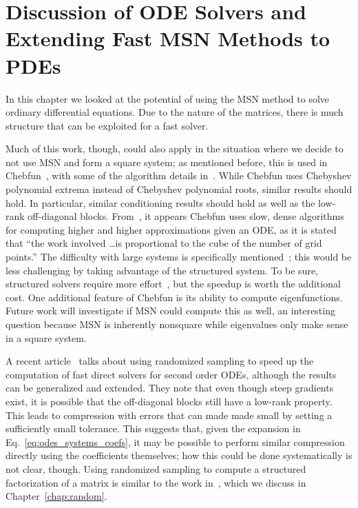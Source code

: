 \section{Discussion of ODE Solvers and Extending Fast MSN Methods to PDEs}
\label{sec:odes_discussion}

In this chapter we looked at the potential of using the MSN
method to solve ordinary differential equations.
Due to the nature of the \CV{} matrices, there is much structure
that can be exploited for a fast solver.

Much of this work, though, could also apply in the situation where
we decide to not use MSN and form a square system; as mentioned before,
this is used in Chebfun~\cite{driscoll2014chebfun}, with some
of the algorithm details
in~\cite{driscoll2015rectangular,aurentz2017block,xu2015explicit}.
While Chebfun uses Chebyshev polynomial extrema instead of Chebyshev
polynomial roots, similar results should hold.
In particular, similar conditioning results should hold
as well as the low-rank off-diagonal blocks.
From~\cite[Appendix A]{ExpODEs}, it appears Chebfun uses slow, dense
algorithms for computing higher and higher approximations given
an ODE, as it is stated that ``the work involved \dots is proportional to
the cube of the number of grid points.''
The difficulty with large systems is specifically
mentioned~\cite[Pages 306--307]{ExpODEs}; this would be less challenging
by taking advantage of the structured system.
To be sure, structured solvers require more effort~\cite{randomHSSLBL},
but the speedup is worth the additional cost.
One additional feature of Chebfun is its ability to compute eigenfunctions.
Future work will investigate if MSN could compute this as well,
an interesting question because MSN is inherently nonsquare while
eigenvalues only make sense in a square system.

A recent article~\cite{shen2016fast} talks about using
randomized sampling to speed up the computation of fast direct
solvers for second order ODEs, although the results can be generalized
and extended.
They note that even though steep gradients exist, it is possible that
the off-diagonal blocks still have a low-rank property.
This leads to compression with errors that can made made small
by setting a sufficiently small tolerance.
This suggests that, given the expansion in Eq.~\eqref{eq:odes_systems_coefs},
it may be possible to perform similar compression
directly using the coefficients themselves; how this could
be done systematically is not clear, though.
Using randomized sampling to compute a structured factorization
of a matrix is similar to the work in~\cite{randomHSSLBL},
which we discuss in Chapter~\ref{chap:random}.

